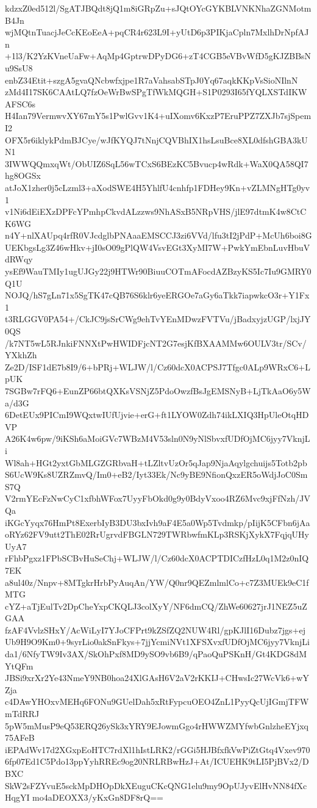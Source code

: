 kdzxZ0ed512l/SgATJBQdt8jQ1m8iGRpZu+sJQtOYcGYKBLVNKNhaZGNMotmB4Jn
wjMQtnTuacjJeCcKEoEeA+pqCR4r623L9I+yUtD6p3PIKjaCpln7MxlhDrNpfAJn
+1l3/K2YzKVneUaFw+AqMp4GptrwDPyDG6+zT4CGB5eVBvWfD5gKJZBBsNu9SsU8
enbZ34Etit+szgA5gvaQNcbwfxjpe1R7aVahsabSTpJ0Yq67aqkKKpVsSioNIlnN
zMd4I17SK6CAAtLQ7fzOeWrBwSPgTfWkMQGH+S1P0293I65fYQLXSTdIKWAFSC6s
H4Ian79VermwvXY67mY5s1PwlGvv1K4+uIXomv6KxzP7EruPPZ7ZXJb7sjSpemI2
OFX5r6iklykPdmBJCye/wJfKYQJ7tNnjCQVBhIX1hsLsuBce8XL0dfshGBA3kUN1
3IWWQQmxqWt/ObUIZ6SqL56wTCxS6BEzKC5Bvucp4wRdk+WaX0QA58QI7hg8OGSx
atJoX1zher0j5cLzml3+aXodSWE4H5YhlfU4cnhfp1FDHey9Kn+vZLMNgHTg0yv1
v1Ni6dEiEXzDPFcYPmhpCkvdALzzws9NhASxB5NRpVHS/jlE97dtmK4w8CtCK6WG
n4Y+nlXAUpq4rfR0VJcdglbPNAaaEMSCCJ3zi6VVd/lfu3tI2jPdP+McUh6boi8G
UEKbgsLg3Z46wHkv+jI0sO09gPlQW4VsvEGt3XyMI7W+PwkYmEbnLuvHbuVdRWqy
ysEf9WauTMIy1ugUJGy22j9HTWr90BiuuCOTmAFocdAZBzyKS5Ic7Iu9GMRY0Q1U
NOJQ/hS7gLn71x5SgTK47cQB76S6klr6yeERGOe7aGy6aTkk7iapwkcO3r+Y1Fx1
t3RLGGV0PA54+/CkJC9jsSrCWg9ehTvYEnMDwzFVTVu/jBadxyjzUGP/lxjJY0QS
/k7NT5wL5RJnkiFNNXtPwHWIDFjcNT2G7esjKfBXAAMMw6OULV3tr/SCv/YXkhZh
Ze2D/ISF1dE7b8I9/6+bPRj+WLJW/l/Cz60dcX0ACPSJ7Tfgc0ALp9WRxC6+LpUK
7SGBw7rFQ6+EunZP66btQXKsVSNjZ5PdoOwzfBsJgEMSNyB+LjTkAaO6y5Wa/d3G
6DetEUx9PICmI9WQxtwIUfUjvie+erG+ft1LYOW0Zdh74ikLXIQ3HpUleOtqHDVP
A26K4w6pw/9iKSh6aMoiGVc7WBzM4V53sln0N9yNlSbvxfUDfOjMC6jyy7VknjLi
Wl8ah+HGt2yxtGbMLGZGRbvaH+tLZltvUzOr5qJap9NjaAqylgchuijs5Totb2pb
S6UcW9Ks8UZRZmvQ/Im0+eB2/Iyt33Ek/Nc9yBE9NfionQxzER5oWdjJoC0SmS7Q
V2rmYEcFzNwCyC1xfbhWFox7UyyFbOkd0g9y0BdyVxoo4RZ6Mvc9xjFfNzh/JVQa
iKGcYyqx76HmPt8ExerbIyB3DU3bxIvh9aF4E5a0Wp5Tvdmkp/pIijK5CFbn6jAa
oRYz62FV9utt2ThE02RrUgrvdFBGLN729TWRbwfmKLp3RSKjXykX7FqjqUHyUyA7
rFhbPgxz1FPbSCBvHuSeChj+WLJW/l/Cz60dcX0ACPTDICzfHzL0q1M2z0nIQ7EK
a8ul40z/Nnpv+8MTgkrHrbPyAuqAn/YW/Q0nr9QEZmlmlCo+c7Z3MUEk9eC1fMTG
cYZ+aTjEulTv2DpCheYxpCKQLJ3colXyY/NF6dmCQ/ZhWe60627jrJ1NEZ5uZGAA
fzAF4VvlzSHxY/AcWiLyI7YJoCFPrt9kZSfZQ2NUW4Rl/gpKJlI16Dubz7jgs+ej
Ub9H9O9Km0+9syrLio0akSnFkys+7jjYcmiNVt1XFSXvxfUDfOjMC6jyy7VknjLi
da1/6NfyTW9Iv3AX/SkOhPxf8MD9ySO9vb6B9/qPaoQuPSKnH/Gt4KDG8dMYtQFm
JBSi9xrXr2Ye43NmeY9NB0hoa24XlGAsH6V2aV2rKKIJ+CHwsIc27WcVk6+wYZja
c4DAwYHOxvMEHq6FONu9GUelDah5xRtFypcuOEO4ZnL1PyyQcUjIGmjTFWmTdRRJ
5pW5mMusP9eQ53ERQ26ySk3xYRY9EJowmGgo4rHWWZMYfwbGnlzheEYjxq75AFeB
iEPAdWv17d2XGxpEoHTC7rdXl1hIstLRK2/rGGi5HJBfxfkVwPiZtGtq4Vxev970
6fp07Ed1C5Pdo13ppYyhRREc9og20NRLRBwHzJ+At/ICUEHK9tLI5PjBVx2/DBXC
SkW2sFZYvuE5sckMpDHOpDkXEuguCKcQNG1elu9my9OpUJyvElHvNN84fXcHqgYI
mo4aDEOXX3/yKxGn8DF8rQ==
